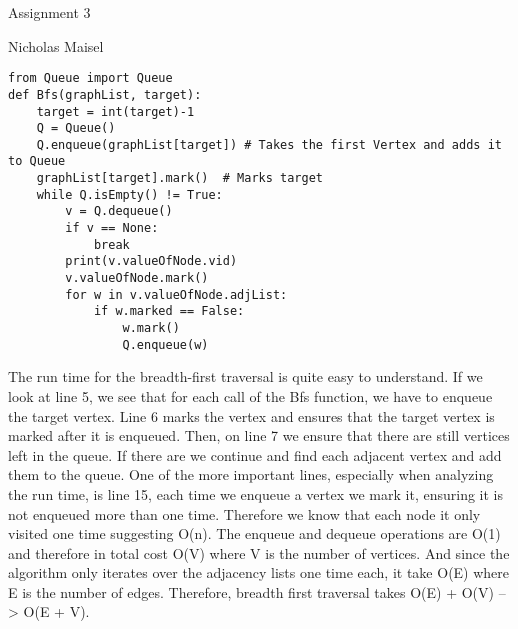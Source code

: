 \documentclass{article}
\begin{document}
\lstset{language=Python}
\lstset{frame=lines}
\lstset{basicstyle=\footnotesize\ttfamily}
\lstset{numbers = left}
\begin{center}
\large{Assignment 3}
\vspace{2mm}

Nicholas Maisel
\end{center}

\vspace{8mm}

\begin{lstlisting}
from Queue import Queue
def Bfs(graphList, target):
    target = int(target)-1
    Q = Queue()
    Q.enqueue(graphList[target]) # Takes the first Vertex and adds it to Queue
    graphList[target].mark()  # Marks target
    while Q.isEmpty() != True:
        v = Q.dequeue()
        if v == None:
            break
        print(v.valueOfNode.vid)
        v.valueOfNode.mark()
        for w in v.valueOfNode.adjList:
            if w.marked == False:
                w.mark()
                Q.enqueue(w)

\end{lstlisting}
\vspace{5mm}
The run time for the breadth-first traversal is quite easy to understand. If we look at line 5, we see that for each call of the Bfs function, we have to enqueue the target vertex. Line 6 marks the vertex and ensures that the target vertex is marked after it is enqueued. Then, on line 7 we ensure that there are still vertices left in the queue. If there are we continue and find each adjacent vertex and add them to the queue. One of the more important lines, especially when analyzing the run time, is line 15, each time we enqueue a vertex we mark it, ensuring it is not enqueued more than one time. Therefore we know that each node it only visited one time suggesting O(n). The enqueue and dequeue operations are O(1) and therefore in total cost O(V) where V is the number of vertices. And since the algorithm only iterates over the adjacency lists one time each, it take O(E) where E is the number of edges. Therefore, breadth first traversal takes O(E) + O(V) --> O(E + V).
\vspace{5mm}
\end{document}
